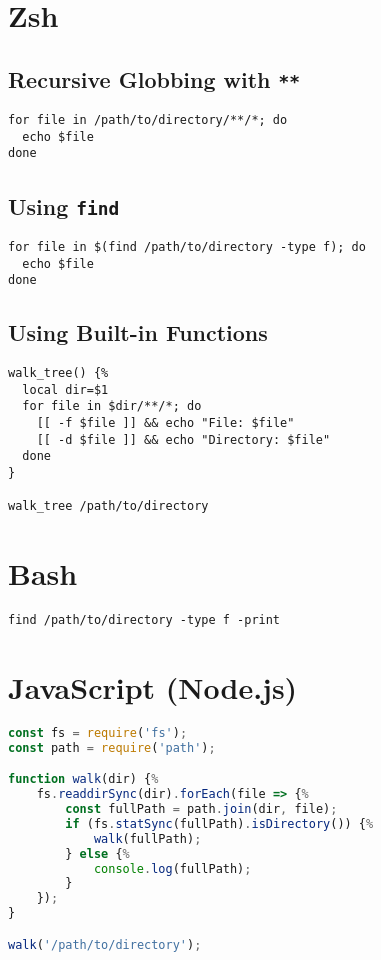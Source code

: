 \documentclass{article}
\begin{document}
\section{Zsh}
\subsection{Recursive Globbing with \texttt{**}}
\begin{lstlisting}
for file in /path/to/directory/**/*; do
  echo $file
done
\end{lstlisting}

\subsection{Using \texttt{find}}
\begin{lstlisting}
for file in $(find /path/to/directory -type f); do
  echo $file
done
\end{lstlisting}

\subsection{Using Built-in Functions}
\begin{lstlisting}
walk_tree() {%
  local dir=$1
  for file in $dir/**/*; do
    [[ -f $file ]] && echo "File: $file"
    [[ -d $file ]] && echo "Directory: $file"
  done
}

walk_tree /path/to/directory
\end{lstlisting}

\section{Bash}
\begin{lstlisting}
find /path/to/directory -type f -print
\end{lstlisting}

\section{JavaScript (Node.js)}
\begin{lstlisting}[language=JavaScript]
const fs = require('fs');
const path = require('path');

function walk(dir) {%
    fs.readdirSync(dir).forEach(file => {%
        const fullPath = path.join(dir, file);
        if (fs.statSync(fullPath).isDirectory()) {%
            walk(fullPath);
        } else {%
            console.log(fullPath);
        }
    });
}

walk('/path/to/directory');
\end{lstlisting}
\end{document}
